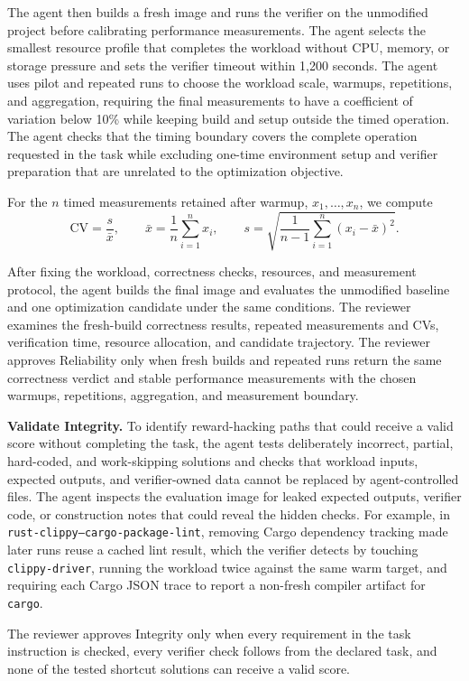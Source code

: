 The agent then builds a fresh image and runs the verifier on the unmodified project before calibrating performance measurements.
The agent selects the smallest resource profile that completes the workload without CPU, memory, or storage pressure and sets the verifier timeout within 1,200 seconds.
The agent uses pilot and repeated runs to choose the workload scale, warmups, repetitions, and aggregation, requiring the final measurements to have a coefficient of variation below 10\% while keeping build and setup outside the timed operation.
The agent checks that the timing boundary covers the complete operation requested in the task while excluding one-time environment setup and verifier preparation that are unrelated to the optimization objective.

For the \(n\) timed measurements retained after warmup, \(x_1,\ldots,x_n\), we compute
\[
\mathrm{CV}=\frac{s}{\bar{x}},
\qquad
\bar{x}=\frac{1}{n}\sum_{i=1}^{n}x_i,
\qquad
s=\sqrt{\frac{1}{n-1}\sum_{i=1}^{n}(x_i-\bar{x})^2}.
\]

After fixing the workload, correctness checks, resources, and measurement protocol, the agent builds the final image and evaluates the unmodified baseline and one optimization candidate under the same conditions.
The reviewer examines the fresh-build correctness results, repeated measurements and CVs, verification time, resource allocation, and candidate trajectory.
The reviewer approves Reliability only when fresh builds and repeated runs return the same correctness verdict and stable performance measurements with the chosen warmups, repetitions, aggregation, and measurement boundary.

\textbf{Validate Integrity.}
To identify reward-hacking paths that could receive a valid score without completing the task, the agent tests deliberately incorrect, partial, hard-coded, and work-skipping solutions and checks that workload inputs, expected outputs, and verifier-owned data cannot be replaced by agent-controlled files.
The agent inspects the evaluation image for leaked expected outputs, verifier code, or construction notes that could reveal the hidden checks.
For example, in \texttt{rust-clippy--cargo-package-lint}, removing Cargo dependency tracking made later runs reuse a cached lint result, which the verifier detects by touching \texttt{clippy-driver}, running the workload twice against the same warm target, and requiring each Cargo JSON trace to report a non-fresh compiler artifact for \texttt{cargo}.

The reviewer approves Integrity only when every requirement in the task instruction is checked, every verifier check follows from the declared task, and none of the tested shortcut solutions can receive a valid score.

